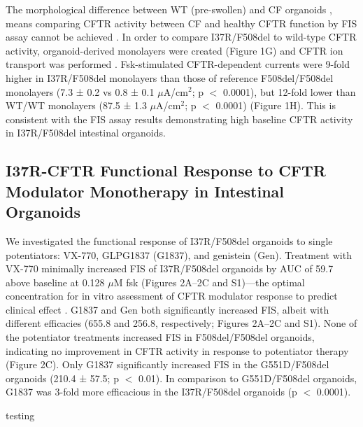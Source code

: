 The morphological difference between WT (pre-swollen) and CF organoids \cite{cuyx2021}, means comparing CFTR activity between CF and healthy CFTR function by FIS assay cannot be achieved \cite{dekkers2016,vanmourik2019}. In order to compare I37R/F508del to wild-type CFTR activity, organoid-derived monolayers were created (Figure 1G) and CFTR ion transport was performed \cite{zomer-vanommen2018}. Fsk-stimulated CFTR-dependent currents were 9-fold higher in I37R/F508del monolayers than those of reference F508del/F508del monolayers (7.3 ± 0.2 vs 0.8 ± 0.1 $\mu$A/cm$^2$; p $<$ 0.0001), but 12-fold lower than WT/WT monolayers (87.5 ± 1.3 $\mu$A/cm$^2$; p $<$ 0.0001) (Figure 1H). This is consistent with the FIS assay results demonstrating high baseline CFTR activity in I37R/F508del intestinal organoids.

\subsection{I37R-CFTR Functional Response to CFTR Modulator Monotherapy in Intestinal Organoids}

We investigated the functional response of I37R/F508del organoids to single potentiators: VX-770, GLPG1837 (G1837), and genistein (Gen). Treatment with VX-770 minimally increased FIS of I37R/F508del organoids by AUC of 59.7 above baseline at 0.128 $\mu$M fsk (Figures 2A–2C and S1)—the optimal concentration for in vitro assessment of CFTR modulator response to predict clinical effect \cite{dekkers2016}. G1837 and Gen both significantly increased FIS, albeit with different efficacies (655.8 and 256.8, respectively; Figures 2A–2C and S1). None of the potentiator treatments increased FIS in F508del/F508del organoids, indicating no improvement in CFTR activity in response to potentiator therapy (Figure 2C). Only G1837 significantly increased FIS in the G551D/F508del organoids (210.4 ± 57.5; p $<$ 0.01). In comparison to G551D/F508del organoids, G1837 was 3-fold more efficacious in the I37R/F508del organoids (p $<$ 0.0001).


testing


